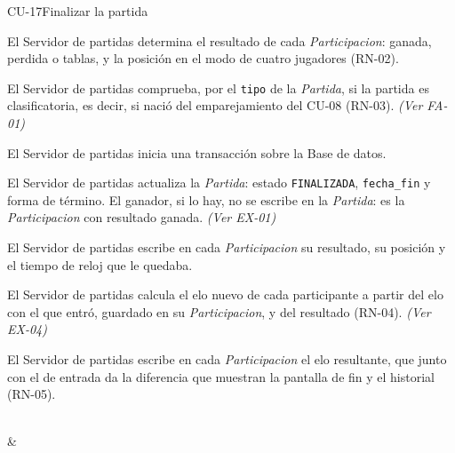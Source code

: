 \begin{fichacu}{CU-17}{Finalizar la partida}
{\begin{cuenum}[start=1]
      \item El Servidor de partidas determina el resultado de cada \textit{Participacion}: ganada, perdida o tablas, y la posición en el modo de cuatro jugadores (\mbox{RN-02}).
      \item El Servidor de partidas comprueba, por el \texttt{tipo} de la \textit{Partida}, si la partida es clasificatoria, es decir, si nació del emparejamiento del \mbox{CU-08} (\mbox{RN-03}). \textit{(Ver \mbox{FA-01})}
      \item El Servidor de partidas inicia una transacción sobre la Base de datos.
      \item El Servidor de partidas actualiza la \textit{Partida}: estado \texttt{FINALIZADA}, \texttt{fecha\_\allowbreak{}fin} y forma de término. El ganador, si lo hay, no se escribe en la \textit{Partida}: es la \textit{Participacion} con resultado ganada. \textit{(Ver \mbox{EX-01})}
      \item El Servidor de partidas escribe en cada \textit{Participacion} su resultado, su posición y el tiempo de reloj que le quedaba.
      \item El Servidor de partidas calcula el elo nuevo de cada participante a partir del elo con el que entró, guardado en su \textit{Participacion}, y del resultado (\mbox{RN-04}). \textit{(Ver \mbox{EX-04})}
      \item El Servidor de partidas escribe en cada \textit{Participacion} el elo resultante, que junto con el de entrada da la diferencia que muestran la pantalla de fin y el historial (\mbox{RN-05}).
    \end{cuenum}} \\
   & 
\end{fichacu}
